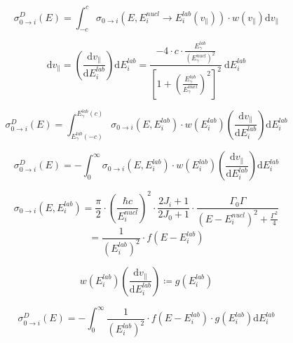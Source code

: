 \documentclass{article}
\begin{document}
\begin{equation}
\label{pseudo_convolution_v}
\sigma^{D}_{0 \to i} (E) = \int_{-c}^{c} \sigma_{0 \to i} (E, E_i^{nucl} \to E_i^{lab}(v_\parallel)) \cdot w(v_\parallel) \mathrm{d} v_\parallel
\end{equation}

\begin{equation}
\label{substitute_v_E}
\mathrm{d} v_\parallel = \left( \frac{\mathrm{d} v_\parallel}{\mathrm{d} E_i^{lab}} \right) \mathrm{d} E_i^{lab} = \frac{- 4 \cdot c \cdot \frac{E_\gamma^{lab}}{\left( E_\gamma^{nucl} \right)^2}}{ \left[ 1 + \left( \frac{E_\gamma^{lab}}{E_\gamma^{nucl}} \right)^2 \right]^2} ~ \mathrm{d} E_i^{lab}
\end{equation}

\begin{equation}
\label{pseudo_convolution_E_0}
\sigma^{D}_{0 \to i} (E) = \int_{E_\gamma^{lab} \left(-c \right)}^{E_\gamma^{lab} \left(c \right)} \sigma_{0 \to i} (E, E_i^{lab}) \cdot w(E_i^{lab}) \left( \frac{\mathrm{d} v_\parallel}{\mathrm{d} E_i^{lab}} \right) \mathrm{d} E_i^{lab}
\end{equation}

\begin{equation}
\label{pseudo_convolution_E}
\sigma^{D}_{0 \to i} (E) = - \int_{0}^{\infty} \sigma_{0 \to i} (E, E_i^{lab}) \cdot w(E_i^{lab}) \left( \frac{\mathrm{d} v_\parallel}{\mathrm{d} E_i^{lab}} \right) \mathrm{d} E_i^{lab}
\end{equation}

\begin{equation}
\label{convolution_f_1}
\sigma_{0 \to i} (E, E_i^{lab}) = \frac{\pi}{2} \cdot \left( \frac{\hbar c}{E_i^{nucl}} \right)^2 \cdot \frac{2 J_i + 1}{2 J_0 + 1} \cdot \frac{\Gamma_0 \Gamma}{\left( E - E_i^{nucl} \right)^2 + \frac{\Gamma^2}{4}} 
\end{equation}
\begin{equation}
= \frac{1}{\left( E_i^{lab} \right)^2} \cdot f\left( E - E^{lab}_i \right)
\end{equation}

\begin{equation}
\label{convolution_g}
	w \left( E^{lab}_i \right)\left( \frac{\mathrm{d} v_\parallel}{\mathrm{d} E_i^{lab}} \right) \coloneqq g \left( E^{lab}_i \right)
\end{equation}

\begin{equation}
\label{convolution_approximation_1}
\sigma^{D}_{0 \to i} (E) = - \int_{0}^{\infty} \frac{1}{\left( E_i^{lab} \right)^2} \cdot f\left( E - E^{lab}_i \right) \cdot g \left( E^{lab}_i \right) \mathrm{d} E_i^{lab}
\end{equation}
\end{document}
